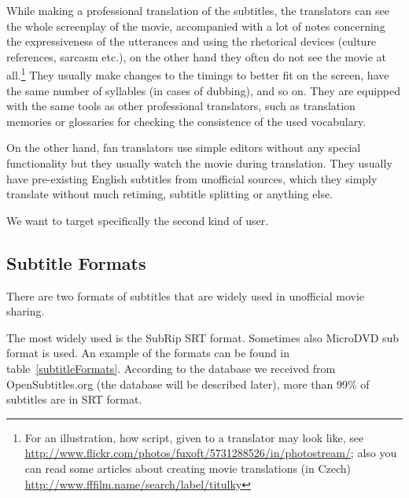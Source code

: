 While making a professional translation of the subtitles, the translators can see the whole screenplay of the movie, accompanied with a lot of notes concerning the expressiveness of the utterances and using the rhetorical devices (culture references, sarcasm etc.), on the other hand they often do not see the movie at all.\footnote{For an illustration, how script, given to a translator may look like, see \url{http://www.flickr.com/photos/fuxoft/5731288526/in/photostream/}; also you can read some articles about creating movie translations (in Czech) \url{http://www.fffilm.name/search/label/titulky}}
They usually make changes to the timings to better fit on the screen, have the same number of syllables (in cases of dubbing), and so on. They are equipped with the same tools as other professional translators, such as translation memories or glossaries for checking the consistence of the used vocabulary.

On the other hand, fan translators use simple editors without any special functionality but they usually watch the movie during translation. They usually have pre-existing English subtitles from unofficial sources, which they simply translate without much retiming, subtitle splitting or anything else.

We want to target specifically the second kind of user.

\subsection{Subtitle Formats}
\label{subtitle_formats}

There are two formats of subtitles that are widely used in unofficial movie sharing.

The most widely used is the SubRip SRT format. Sometimes also MicroDVD sub format is used. An example of the formats can be found in table~\ref{subtitleFormats}. According to the database we received from OpenSubtitles.org (the database will be described later), more than 99\% of subtitles are in SRT format.

